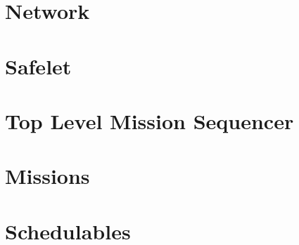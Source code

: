 \documentclass[10pt,a4paper]{article}
\begin{document}
\section{Network}

\newpage

\section{Safelet}

\newpage

\section{Top Level Mission Sequencer}

\newpage

\section{Missions}

\newpage

\section{Schedulables}

\newpage

\end{document}

